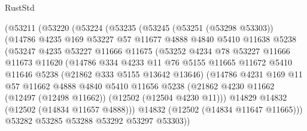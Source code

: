\begin{lexlean}{RustStd}
\begin{coremodule}
              (@53211
                (@53220
                  (@53224
                    (@53235
                      (@53245
                        (@53251 (@53298 @53303))
                        (@14786
                          @4235
                          @169
                          @53227
                          @57
                          @11677
                          @4888
                          @4840
                          @5410
                          @11638
                          @5238
                          (@53247
                            @4235
                            @53227
                            @11666
                            @11675
                            (@53252
                              @4234
                              @78
                              @53227
                              @11666
                              @11673
                              @11620
                              (@14786
                                @334
                                @4233
                                @11
                                @76
                                @5155
                                @11665
                                @11672
                                @5410
                                @11646
                                @5238
                                (@21862 @333 @5155 @13642 @13646)
                                (@14786
                                  @4231
                                  @169
                                  @11
                                  @57
                                  @11662
                                  @4888
                                  @4840
                                  @5410
                                  @11656
                                  @5238
                                  (@21862
                                    @4230
                                    @11662
                                    (@12497 (@12498 @11662))
                                    (@12502 (@12504 @4230 @11)))
                                  @14829
                                  @14832
                                  (@12502 (@14834 @11657 @4888)))
                                @14832
                                (@12502 (@14834 @11647 @11665)))
                              @53282
                              @53285
                              @53288
                              @53292
                              @53297
                              @53303))

\end{coremodule}
\end{lexlean}
